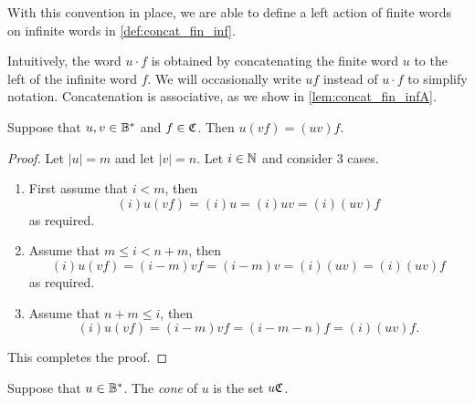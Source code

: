 With this convention in place, we are able to define a left action of finite words on infinite words in \cref{def:concat_fin_inf}.


Intuitively, the word $u\cdot f$ is obtained by concatenating the finite word $u$ to the left of the infinite word $f$.
We will occasionally write $uf$ instead of $u\cdot f$ to simplify notation. Concatenation is associative, as we show in
\cref{lem:concat_fin_infA}.

\begin{lemma}%
    \label{lem:concat_fin_infA}
    Suppose that $u, v\in \mathbb{B}^\ast$ and $f\in \mathfrak{C}$. Then $u(vf) = (uv)f$.
\end{lemma}
\begin{proof}
    Let $|u| = m$ and let $|v| = n$. Let $i \in {\mathbb{N}}$ and consider 3 cases.
    \begin{enumerate}[1)]
        \item First assume that $i < m$, then
        \[
            (i)u(vf) = (i)u = (i)uv = (i)(uv)f
        \]
        as required.
        \item Assume that $m \leq i < n+m$, then
        \[
            (i)u(vf) = (i-m)vf = (i-m)v = (i)(uv) = (i)(uv)f
        \]
        as required.
        \item Assume that $n + m \leq i$, then
        \[
            (i)u(vf) = (i-m)vf = (i - m - n)f = (i)(uv)f.
        \]
    \end{enumerate}
    This completes the proof.
\end{proof}

\begin{definition}\label{def:cones}
Suppose that \(u\in \mathbb{B}^*\). The \emph{cone} of \(u\) is the set \(u\mathfrak{C}\).
\end{definition}

